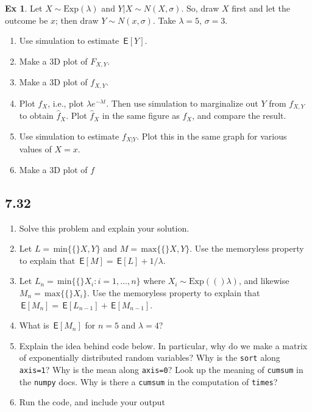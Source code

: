 \documentclass[a4paper]{article}
\theoremstyle{definition}
\newtheorem{exercise}{Ex}[section]
\newcommand{\Exp}[1]{\mathrm{Exp}(#1)}
\renewcommand{\max}[1]{\,\mathrm{max}\{#1\}}
\renewcommand{\min}[1]{\,\mathrm{min}\{#1\}}
\newcommand{\E}[1]{\,\mathsf{E}\left[#1\right]}
\newcommand{\1}[1]{\,I_{#1}} %
\begin{document}
\begin{exercise}
Let $X\sim\Exp{\lambda}$ and $Y| X \sim N(X, \sigma)$. So,  draw $X$ first and let the outcome be $x$;  then draw $Y\sim N(x, \sigma)$. Take $\lambda = 5$, $\sigma=3$. 
\begin{enumerate}
\item Use simulation to estimate $\E Y$. 
\item Make a 3D plot of $F_{X,Y}$.
\item Make a 3D plot of $f_{X,Y}$.
\item Plot $f_{X}$, i.e., plot $\lambda e^{-\lambda t}$.
  Then use simulation to marginalize out $Y$ from $f_{X,Y}$ to obtain $\hat f_X$.
  Plot $\hat f_X$ in the same figure as $f_X$, and compare the result.
\item Use simulation to estimate $f_{X|Y}$. Plot this in the same graph for various values of $X=x$. 
\item Make a 3D plot of $f$
\end{enumerate}
\end{exercise}





\subsection{7.32}
\label{sec:orga22aa79}

\begin{enumerate}
\item Solve this problem and explain your solution.
\item Let \(L=\min\{X,Y\}\) and \(M=\max\{X,Y\}\). Use the memoryless property to explain that \(\E M = \E L + 1/\lambda\).
\item Let \(L_{n}=\min\{X_{i} : i = 1,\ldots, n\}\) where \(X_i\sim \Exp(\lambda)\), and likewise  \(M_{n}=\max\{X_i\}\). Use the memoryless property to explain that \(\E{M_{n}} = \E{L_{n-1}} + \E{M_{n-1}}\).
\item What is \(\E{M_n}\) for \(n=5\) and \(\lambda = 4\)?
\item Explain the idea behind code below. In particular, why do we make a matrix of exponentially distributed random variables? Why is the \texttt{sort} along \texttt{axis=1}? Why is the mean along \texttt{axis=0}? Look up the meaning of \texttt{cumsum} in the \texttt{numpy} docs. Why is there a \texttt{cumsum} in the computation of \texttt{times}?
\item Run the code, and include your output
\end{enumerate}
\end{document}
